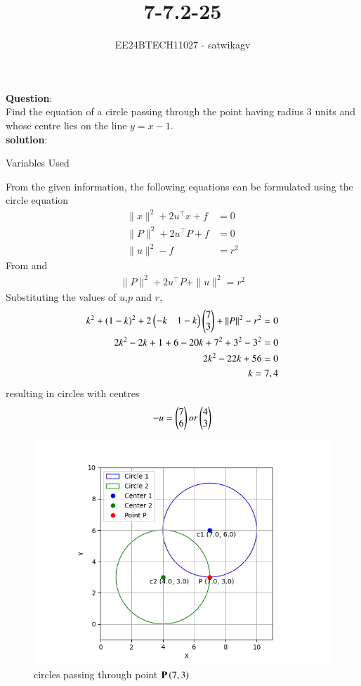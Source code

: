 \documentclass[journal]{IEEEtran}
\begin{document}

\vspace{3cm}

\title{7-7.2-25}
\author{EE24BTECH11027 - satwikagv}
{\let\newpage\relax\maketitle}

\renewcommand{\thefigure}{\theenumi}
\renewcommand{\thetable}{\theenumi}
\setlength{\intextsep}{10pt} %


\renewcommand{\thetable}{\theenumi}
\textbf{Question}:\\
Find the equation of a circle passing through the point  having radius 3 units and whose centre lies on the line $y=x-1$.\\
\textbf{solution}:
\begin{table}[h!]    
  \centering
  
  \caption{Variables Used}
\end{table}
From the given information, the following equations can be formulated using the circle equation 
\begin{align}
\|x\|^2 + 2u^\top x + f &= 0\\
\|P\|^2 + 2u^\top P + f &= 0\\
\|u\|^2 - f &= r^2
\end{align}
From  and 
\begin{align}
\|P\|^2 + 2u^\top P + \|u\|^2 = r^2 	
\end{align}
Substituting the values of $u$,$p$ and $r$,
\begin{align}
k^2+(1-k)^2+2\begin{pmatrix}-k&1-k\end{pmatrix}\begin{pmatrix}7\\3\end{pmatrix}+\|P\|^2-r^2 = 0\\
2k^2-2k+1+6-20k+7^2+3^2-3^2=0\\
2k^2-22k+56=0\\
k=7,4
\end{align}
resulting in circles with centres 
\begin{align}
-u=\begin{pmatrix}7\\6\end{pmatrix} or \begin{pmatrix}4\\3\end{pmatrix}	
\end{align}
\begin{figure}[h!]
   \centering
   \includegraphics[width=0.7\linewidth]{figs/circle_plot.png}
   \caption{circles passing through point $\mathbf{P}\left(7,3\right)$}
\end{figure}
\end{document}
